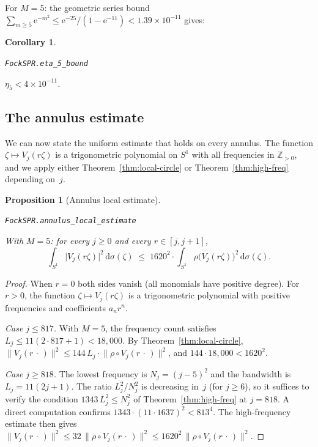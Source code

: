 \documentclass[11pt]{amsart}
\newtheorem{proposition}[theorem]{Proposition}
\newtheorem{corollary}[theorem]{Corollary}
\theoremstyle{definition}
\theoremstyle{remark}
\begin{document}
For $M = 5$: the geometric series bound
$\sum_{m \ge 5}\mathrm{e}^{-m^2} \le \mathrm{e}^{-25}/(1 - \mathrm{e}^{-11}) < 1.39 \times
10^{-11}$ gives:

\begin{corollary}\label{cor:eta5}
\par\noindent\texttt{FockSPR.eta\_5\_bound}\par\smallskip
$\eta_5 < 4 \times 10^{-11}$.
\end{corollary}

\subsection{The annulus estimate}\label{sec:annulus}

We can now state the uniform estimate that holds on every annulus.  The
function $\zeta \mapsto V_j(r\zeta)$ is a trigonometric polynomial on $S^1$
with all frequencies in $\mathbb{Z}_{>0}$, and we apply either
Theorem~\ref{thm:local-circle} or Theorem~\ref{thm:high-freq} depending
on~$j$.

\begin{proposition}[Annulus local estimate]\label{prop:annulus}
\par\noindent\texttt{FockSPR.annulus\_local\_estimate}\par\smallskip
With $M = 5$: for every $j \ge 0$ and every $r \in [j, j{+}1]$,
\[
\int_{S^1}\lvert V_j(r\zeta) \rvert^2\,\mathrm{d}\sigma(\zeta)
\;\le\;
1620^2 \cdot
\int_{S^1}\rho\bigl(V_j(r\zeta)\bigr)^2\,\mathrm{d}\sigma(\zeta).
\]
\end{proposition}

\begin{proof}
When $r = 0$ both sides vanish (all monomials have positive degree).
For $r > 0$, the function $\zeta \mapsto V_j(r\zeta)$ is a trigonometric
polynomial with positive frequencies and coefficients $a_n r^n$.

\smallskip\noindent
\emph{Case $j \le 817$.}\;
With $M = 5$, the frequency count satisfies $L_j \le 11(2 \cdot 817 + 1)
< 18{,}000$.  By Theorem~\ref{thm:local-circle},
$\lVert V_j(r\,\cdot\,) \rVert^2 \le 144\, L_j \cdot
\lVert \rho \circ V_j(r\,\cdot\,) \rVert^2$, and
$144 \cdot 18{,}000 < 1620^2$.

\smallskip\noindent
\emph{Case $j \ge 818$.}\;
The lowest frequency is $N_j = (j{-}5)^2$ and the bandwidth is
$L_j = 11(2j{+}1)$.  The ratio $L_j^2/N_j^2$ is decreasing in~$j$
(for $j \ge 6$), so it suffices to verify the condition
$1343\,L_j^2 \le N_j^2$ of Theorem~\ref{thm:high-freq} at $j = 818$.
A direct computation confirms $1343 \cdot (11 \cdot 1637)^2 < 813^4$.
The high-frequency estimate then gives
$\lVert V_j(r\,\cdot\,) \rVert^2 \le 32\,\lVert \rho \circ V_j(r\,\cdot\,) \rVert^2
\le 1620^2\,\lVert \rho \circ V_j(r\,\cdot\,) \rVert^2$.
\end{proof}
\end{document}
